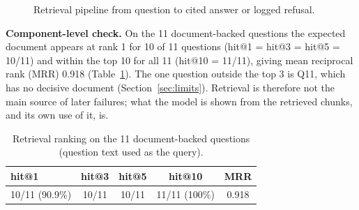\documentclass[10pt,a4paper]{article}
\begin{document}
\begin{figure}[H]
\centering
{}
\caption{Retrieval pipeline from question to cited answer or logged refusal.}\label{fig:pipe}
\end{figure}

\textbf{Component-level check.} On the 11 document-backed questions the expected document appears at rank 1 for 10 of 11 questions (hit@1 = hit@3 = hit@5 = 10/11) and within the top 10 for all 11 (hit@10 = 11/11), giving mean reciprocal rank (MRR) 0.918 (Table~\ref{tab:rank}). The one question outside the top 3 is Q11, which has no decisive document (Section~\ref{sec:limits}). Retrieval is therefore not the main source of later failures; what the model is shown from the retrieved chunks, and its own use of it, is.

\begin{table}[H]
\centering\small
\caption{Retrieval ranking on the 11 document-backed questions (question text used as the query).}\label{tab:rank}
\begin{tabular}{@{}lcccc@{}}
\toprule
\textbf{hit@1} & \textbf{hit@3} & \textbf{hit@5} & \textbf{hit@10} & \textbf{MRR}\\
\midrule
10/11 (90.9\%) & 10/11 & 10/11 & 11/11 (100\%) & 0.918\\
\bottomrule
\end{tabular}
\end{table}
\end{document}
